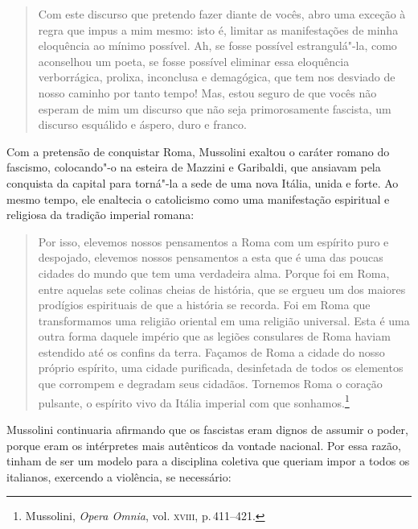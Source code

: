 \begin{quote}
Com este discurso que pretendo fazer diante de vocês, abro uma exceção à
regra que impus a mim mesmo: isto é, limitar as manifestações de minha
eloquência ao mínimo possível. Ah, se fosse possível estrangulá"-la, como
aconselhou um poeta, se fosse possível eliminar essa eloquência
verborrágica, prolixa, inconclusa e demagógica, que tem nos desviado de
nosso caminho por tanto tempo! Mas, estou seguro de que vocês não
esperam de mim um discurso que não seja primorosamente fascista, um
discurso esquálido e áspero, duro e franco.
\end{quote}

Com a pretensão de conquistar Roma, Mussolini exaltou o caráter romano
do fascismo, colocando"-o na esteira de Mazzini e Garibaldi, que ansiavam
pela conquista da capital para torná"-la a sede de uma nova Itália, unida
e forte. Ao mesmo tempo, ele enaltecia o catolicismo como uma
manifestação espiritual e religiosa da tradição imperial romana:

\begin{quote}
Por isso, elevemos nossos pensamentos a Roma com um espírito puro e
despojado, elevemos nossos pensamentos a esta que é uma das poucas
cidades do mundo que tem uma verdadeira alma. Porque foi em Roma, entre
aquelas sete colinas cheias de história, que se ergueu um dos maiores
prodígios espirituais de que a história se recorda. Foi em Roma que
transformamos uma religião oriental em uma religião universal. Esta é
uma outra forma daquele império que as legiões consulares de Roma haviam
estendido até os confins da terra. Façamos de Roma a cidade do nosso
próprio espírito, uma cidade purificada, desinfetada de todos os
elementos que corrompem e degradam seus cidadãos. Tornemos Roma o
coração pulsante, o espírito vivo da Itália imperial com que
sonhamos.\footnote{Mussolini, \emph{Opera Omnia}, vol. \textsc{xviii}, p.\,411--421.}
\end{quote}

Mussolini continuaria afirmando que os fascistas eram dignos de assumir
o poder, porque eram os intérpretes mais autênticos da vontade nacional.
Por essa razão, tinham de ser um modelo para a disciplina coletiva que
queriam impor a todos os italianos, exercendo a violência, se
necessário:

